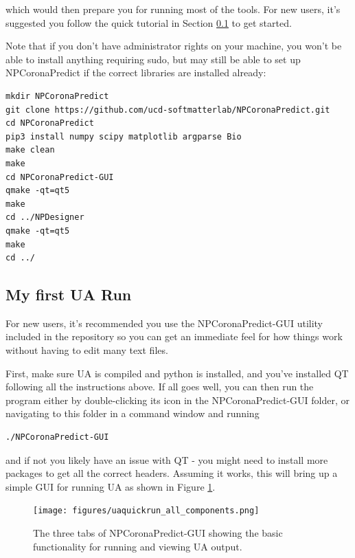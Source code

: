 \documentclass[10pt,a4paper,onecolumn]{report}
\begin{document}
 which would then prepare you for running most of the tools. For new users, it's suggested you follow the quick tutorial in Section \ref{section:myFirstRun} to get started. 

Note that if you don't have administrator rights on your machine, you won't be able to install anything requiring sudo, but may still be able to set up NPCoronaPredict if the correct libraries are installed already:

\begin{lstlisting}
mkdir NPCoronaPredict
git clone https://github.com/ucd-softmatterlab/NPCoronaPredict.git
cd NPCoronaPredict
pip3 install numpy scipy matplotlib argparse Bio
make clean
make
cd NPCoronaPredict-GUI
qmake -qt=qt5
make
cd ../NPDesigner
qmake -qt=qt5
make
cd ../
\end{lstlisting}
 


\subsection{My first UA Run} \label{section:myFirstRun}
For new users, it's recommended you use the NPCoronaPredict-GUI utility included in the repository so you can get an immediate feel for how things work without having to edit many text files. 

First, make sure UA is compiled and python is installed, and you've installed QT following all the instructions above.  If all goes well, you can then run the program either by double-clicking its icon in the NPCoronaPredict-GUI folder, or navigating to this folder in a command window and running
\begin{lstlisting}
./NPCoronaPredict-GUI
\end{lstlisting}
and if not you likely have an issue with QT - you might need to install more packages to get all the correct headers. Assuming it works, this will bring up a simple GUI for running UA as shown in Figure \ref{fig:uaquickrun_screen}.

\begin{figure} \label{fig:uaquickrun_screen}
    \centering
    \texttt{[image: figures/uaquickrun\_all\_components.png]}
    \caption{The three tabs of NPCoronaPredict-GUI showing the basic functionality for running and viewing UA output.  }
\end{figure}
\end{document}
